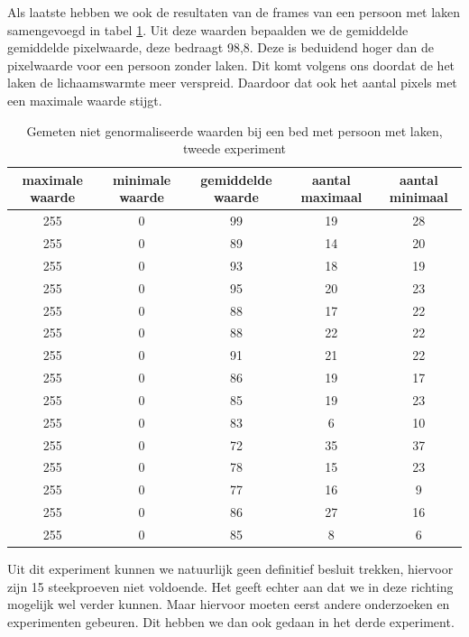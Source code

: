 Als laatste hebben we ook de resultaten van de frames van een persoon met laken samengevoegd in tabel \ref{refTabPZNPL}. Uit deze waarden bepaalden we de gemiddelde gemiddelde pixelwaarde, deze bedraagt 98,8. Deze is beduidend hoger dan de pixelwaarde voor een persoon zonder laken. Dit komt volgens ons doordat de het laken de lichaamswarmte meer verspreid. Daardoor dat ook het aantal pixels met een maximale waarde stijgt. \\
\begin{table}[hbp]
	\begin{tabular}{|c|c|c|c|c|}
		\hline
		maximale waarde & minimale waarde & gemiddelde waarde & aantal maximaal & aantal minimaal \\ \hline
		255 & 0 & 99 & 19 & 28 \\ \hline
		255 & 0 & 89 & 14 & 20 \\ \hline
		255 & 0 & 93 & 18 & 19 \\ \hline
		255 & 0 & 95 & 20 & 23 \\ \hline
		255 & 0 & 88 & 17 & 22 \\ \hline
		255 & 0 & 88 & 22 & 22 \\ \hline
		255 & 0 & 91 & 21 & 22 \\ \hline
		255 & 0 & 86 & 19 & 17 \\ \hline
		255 & 0 & 85 & 19 & 23 \\ \hline
		255 & 0 & 83 & 6  & 10 \\ \hline
		255 & 0 & 72 & 35 & 37 \\ \hline
		255 & 0 & 78 & 15 & 23 \\ \hline
		255 & 0 & 77 & 16 & 9  \\ \hline
		255 & 0 & 86 & 27 & 16 \\ \hline
		255 & 0 & 85 & 8  & 6  \\ \hline
	\end{tabular}
	\caption{Gemeten niet genormaliseerde waarden bij een bed met persoon met laken, tweede experiment}
	\label{refTabPZNPL}
\end{table}
Uit dit experiment kunnen we natuurlijk geen definitief besluit trekken, hiervoor zijn 15 steekproeven niet voldoende. Het geeft echter aan dat we in deze richting mogelijk wel verder kunnen. Maar hiervoor moeten eerst andere onderzoeken en experimenten gebeuren. Dit hebben we dan ook gedaan in het derde experiment. 

